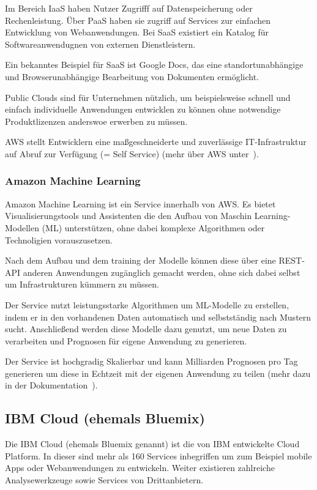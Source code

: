 Im Bereich IaaS haben Nutzer Zugrifff auf Datenspeicherung oder Rechenleistung. Über PaaS haben sie zugriff auf
Services zur einfachen Entwicklung von Webanwendungen. Bei SaaS existiert ein Katalog für Softwareanwendugnen von
externen Dienstleistern.

Ein bekanntes Beispiel für SaaS ist Google Docs, das eine standortunabhängige und Browserunabhängige Bearbeitung von
Dokumenten ermöglicht.

Public Clouds sind für Unternehmen nützlich, um beispielsweise schnell und einfach individuelle Anwendungen entwicklen
zu können ohne notwendige Produktlizenzen anderswoe erwerben zu müssen.

AWS stellt Entwicklern eine maßgeschneiderte und zuverlässige IT-Infrastruktur auf Abruf zur Verfügung (= Self Service)
(mehr über AWS unter~\cite{online_grundlagen_aws}).

\subsubsection{Amazon Machine Learning}
Amazon Machine Learning ist ein Service innerhalb von AWS. Es bietet Visualisierungstools und Assistenten die den Aufbau
von Maschin Learning-Modellen (ML) unterstützen, ohne dabei komplexe Algorithmen oder Technoligien vorauszusetzen.

Nach dem Aufbau und dem training der Modelle können diese über eine REST-API anderen Anwendungen zugänglich gemacht
werden, ohne sich dabei selbst um Infrastrukturen kümmern zu müssen.

Der Service nutzt leistungsstarke Algorithmen um ML-Modelle zu erstellen, indem er in den vorhandenen Daten automatisch
und selbstständig nach Mustern sucht. Anschließend werden diese Modelle dazu genutzt, um neue Daten zu verarbeiten und
Prognosen für eigene Anwendung zu generieren.

Der Service ist hochgradig Skalierbar und kann Milliarden Prognosen pro Tag generieren um diese in Echtzeit mit der
eigenen Anwendung zu teilen (mehr dazu in der Dokumentation~\cite{online_grundlagen_aws_learning}).

\subsection{IBM Cloud (ehemals Bluemix)}
Die IBM Cloud (ehemals Bluemix genannt) ist die von IBM entwickelte Cloud Platform. In dieser sind mehr als 160 Services
inbegriffen um zum Beispiel mobile Apps oder Webanwendungen zu entwickeln. Weiter existieren zahlreiche Analysewerkzeuge
sowie Services von Drittanbietern.

